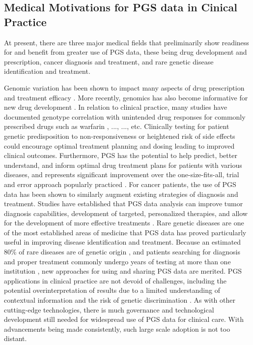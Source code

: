 \documentclass[a4paper,11pt]{article}
\begin{document}
\subsection{Medical Motivations for PGS data in Cinical Practice}
At present, there are three major medical fields that preliminarily show readiness for and benefit from greater use of PGS data, these being drug development and prescription, cancer diagnosis and treatment, and rare genetic disease identification and treatment.

Genomic variation has been shown to impact many aspects of drug prescription and treatment efficacy \cite{feero_genomics_2011}. 
More recently, genomics has also become informative for new drug development \cite{ko_new_2022}. 
In relation to clinical practice, many studies have documented genotype correlation with unintended drug responses for commonly prescribed drugs such as warfarin \cite{linder_genetic_2001}, ..., ..., etc. 
Clinically testing for patient genetic predisposition to non-responsiveness or heightened risk of side effects could encourage optimal treatment planning and dosing leading to improved clinical outcomes. 
Furthermore, PGS has the potential to help predict, better understand, and inform optimal drug treatment plans for patients with various diseases, and represents significant improvement over the one-size-fits-all, trial and error approach popularly practiced \cite{hens_return_2011}. 
For cancer patients, the use of PGS data has been shown to similarly augment existing strategies of diagnosis and treatment. Studies have established that PGS data analysis can improve tumor diagnosis capabilities, development of targeted, personalized therapies, and allow for the development of more effective treatments \cite{mcleod_cancer_2013}. 
Rare genetic diseases are one of the most established areas of medicine that PGS data has proved particularly useful in improving disease identification and treatment. 
Because an estimated 80\% of rare diseases are of genetic origin \cite{zhu_whole-exome_2015}, and patients searching for diagnosis and proper treatment commonly undergo years of testing at more than one institution \cite{marwaha_guide_2022}, new approaches for using and sharing PGS data are merited. 
PGS applications in clinical practice are not devoid of challenges, including the potential overinterpretation of results due to a limited understanding of contextual information and the risk of genetic discrimination \cite{alzubi_personal_2014}. 
As with other cutting-edge technologies, there is much governance and technological development still needed for widespread use of PGS data for clinical care. 
With advancements being made consistently, such large scale adoption is not too distant.
\end{document}
